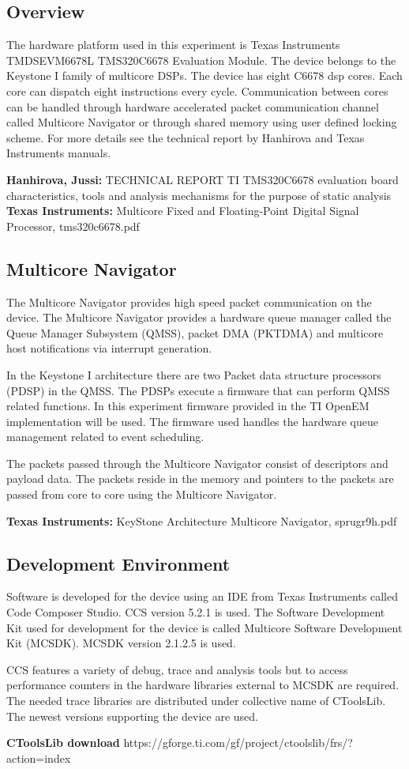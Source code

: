 \subsection{Overview}
The hardware platform used in this experiment is Texas Instruments TMDSEVM6678L TMS320C6678 Evaluation Module. The device belongs to the Keystone I family of multicore DSPs. The device has eight C6678 dsp cores. Each core can dispatch eight instructions every cycle. Communication between cores can be handled through hardware accelerated packet communication channel called Multicore Navigator or through shared memory using user defined locking scheme. For more details see the technical report by Hanhirova and Texas Instruments manuals.

\textbf{Hanhirova, Jussi:} TECHNICAL REPORT TI TMS320C6678 evaluation board characteristics, tools and analysis mechanisms for the purpose of static analysis\\
\textbf{Texas Instruments:} Multicore Fixed and Floating-Point Digital Signal Processor, tms320c6678.pdf

\subsection{Multicore Navigator}\label{navigator}
The Multicore Navigator provides high speed packet communication on the device. The Multicore Navigator provides a hardware queue manager called the Queue Manager Subsystem (QMSS), packet DMA (PKTDMA) and multicore host notifications via interrupt generation.

In the Keystone I architecture there are two Packet data structure processors (PDSP) in the QMSS. The PDSPs execute a firmware that can perform QMSS related functions. In this experiment firmware provided in the TI OpenEM implementation will be used. The firmware used handles the hardware queue management related to event scheduling.

The packets passed through the Multicore Navigator consist of descriptors and payload data. The packets reside in the memory and pointers to the packets are passed from core to core using the Multicore Navigator.

\textbf{Texas Instruments:} KeyStone Architecture Multicore Navigator, sprugr9h.pdf

\subsection{Development Environment}\label{MCSDK}
Software is developed for the device using an IDE from Texas Instruments called Code Composer Studio. CCS version 5.2.1 is used. The Software Development Kit used for development for the device is called Multicore Software Development Kit (MCSDK). MCSDK version 2.1.2.5 is used.

CCS features a variety of debug, trace and analysis tools but to access performance counters in the hardware libraries external to MCSDK are required. The needed trace libraries are distributed under collective name of CToolsLib. The newest versions supporting the device are used.

\textbf{CToolsLib download} https://gforge.ti.com/gf/project/ctoolslib/frs/?action=index
